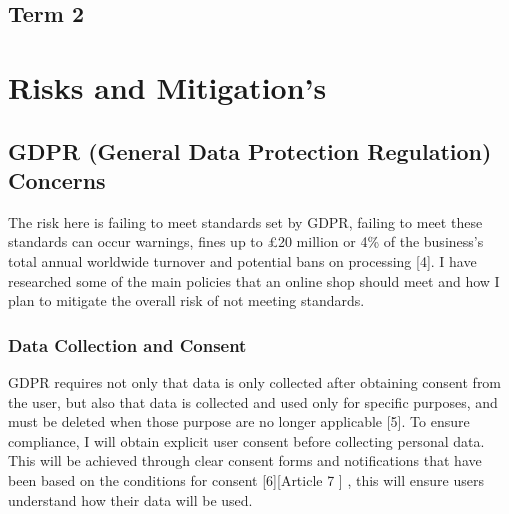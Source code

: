\documentclass[]{project_report}
\begin{document}
\begin{center}
\end{center}




\section{Term 2}

\chapter{Risks and Mitigation's}

\section{GDPR (General Data Protection Regulation) Concerns}

The risk here is failing to meet standards set by GDPR, failing to meet these standards can occur warnings, fines up to £20 million or 4\% of the business’s total annual worldwide turnover and potential bans on processing [4]. I have researched some of the main policies that an online shop should meet and how I plan to mitigate the overall risk of not meeting standards.

\subsection{Data Collection and Consent}
GDPR requires not only that data is only collected after obtaining consent from the user, but also that data is collected and used only for specific purposes, and must be deleted when those purpose are no longer applicable [5]. To ensure compliance, I will obtain explicit user consent before collecting personal data. This will be achieved through clear consent forms and notifications that have been based on the conditions for consent [6][Article 7 ] , this will ensure users understand how their data will be used.
\end{document}
